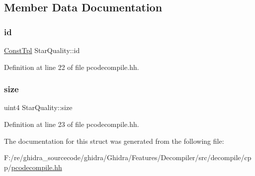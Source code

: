 \subsection{Member Data Documentation}
\mbox{\label{struct_star_quality_a557bd6565a0049fc69817cebe9899906}} 
\subsubsection{\texorpdfstring{id}{id}}
{\footnotesize\ttfamily \mbox{\hyperlink{class_const_tpl}{Const\+Tpl}} Star\+Quality\+::id}



Definition at line 22 of file pcodecompile.\+hh.

\mbox{\label{struct_star_quality_a9e229c08a26a7f9f789660f694b57547}} 
\subsubsection{\texorpdfstring{size}{size}}
{\footnotesize\ttfamily uint4 Star\+Quality\+::size}



Definition at line 23 of file pcodecompile.\+hh.



The documentation for this struct was generated from the following file\+:\begin{DoxyCompactItemize}
\item 
F\+:/re/ghidra\+\_\+sourcecode/ghidra/\+Ghidra/\+Features/\+Decompiler/src/decompile/cpp/\mbox{\hyperlink{pcodecompile_8hh}{pcodecompile.\+hh}}\end{DoxyCompactItemize}
